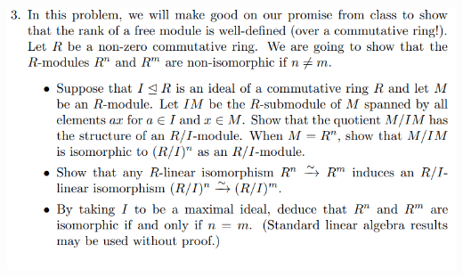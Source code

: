 \documentclass[12pt,letterpaper,boxed]{hmcpset}
\begin{document}
\begin{problem}
	\includegraphics[scale=0.7]{3.png}
	\hfill
\end{problem}
\end{document}
